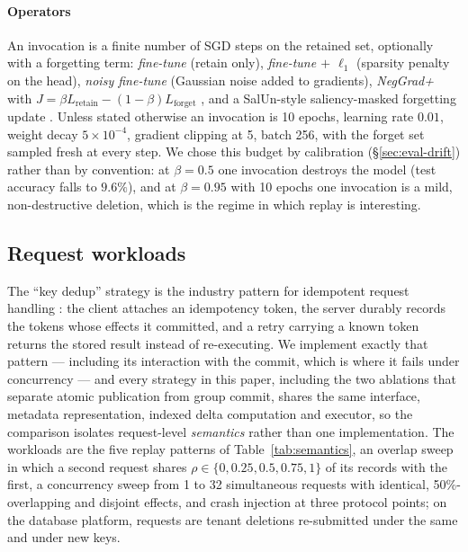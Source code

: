 \documentclass[conference]{IEEEtran}
\begin{document}
\paragraph{Operators}
An invocation is a finite number of SGD steps on the retained set, optionally with a
forgetting term:
\emph{fine-tune} (retain only), \emph{fine-tune $+$ $\ell_1$} (sparsity penalty on
the head), \emph{noisy fine-tune} (Gaussian noise added to gradients),
\emph{NegGrad+} with $J=\beta L_{\text{retain}}-(1-\beta)L_{\text{forget}}$
\cite{kurmanji2023unbounded}, and a SalUn-style saliency-masked forgetting update
\cite{fan2024salun}.  Unless stated otherwise an invocation is 10 epochs, learning
rate $0.01$, weight decay $5\times10^{-4}$, gradient clipping at 5, batch 256, with
the forget set sampled fresh at every step.  We chose this budget by calibration
(\S\ref{sec:eval-drift}) rather than by convention: at $\beta=0.5$ one invocation
destroys the model (test accuracy falls to $9.6\%$), and at $\beta=0.95$ with 10
epochs one invocation is a mild, non-destructive deletion, which is the regime in
which replay is interesting.

\subsection{Request workloads}

The ``key dedup'' strategy is the industry pattern for idempotent request handling
\cite{helland2012idempotence}: the client attaches an idempotency token, the server durably
records the tokens whose effects it committed, and a retry carrying a known token returns
the stored result instead of re-executing.  We implement exactly that pattern --- including
its interaction with the commit, which is where it fails under concurrency --- and every
strategy in this paper, including the two ablations that separate atomic publication from
group commit, shares the same interface, metadata representation, indexed delta computation
and executor, so the comparison isolates request-level \emph{semantics} rather than one
implementation.  The workloads are the five replay patterns of
Table~\ref{tab:semantics}, an overlap sweep in which a second request shares
$\rho\in\{0,0.25,0.5,0.75,1\}$ of its records with the first, a concurrency sweep from 1 to
32 simultaneous requests with identical, 50\%-overlapping and disjoint effects, and crash
injection at three protocol points; on the database platform, requests are tenant deletions
re-submitted under the same and under new keys.
\end{document}
